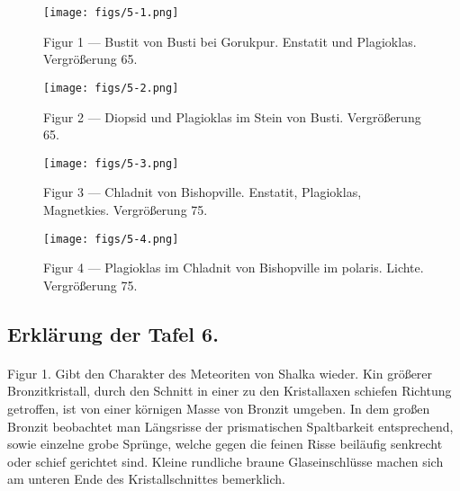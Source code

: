 \documentclass[a4paper, 11pt, oneside, polutonikogreek, german]{article}
\begin{document}
\vspace*{\fill}
\begin{figure}[H]
\centering
\texttt{[image: figs/5-1.png]}
\caption{\small Figur 1 --- Bustit von Busti bei Gorukpur. Enstatit und Plagioklas. Vergrößerung 65.}
\end{figure}
\vspace*{\fill}
\clearpage

\vspace*{\fill}
\begin{figure}[H]
\centering
\texttt{[image: figs/5-2.png]}
\caption{\small Figur 2 --- Diopsid und Plagioklas im Stein von Busti. Vergrößerung 65.}
\end{figure}
\vspace*{\fill}
\clearpage

\vspace*{\fill}
\begin{figure}[H]
\centering
\texttt{[image: figs/5-3.png]}
\caption{\small Figur 3 --- Chladnit von Bishopville. Enstatit, Plagioklas, Magnetkies. Vergrößerung 75.}
\end{figure}
\vspace*{\fill}
\clearpage

\vspace*{\fill}
\begin{figure}[H]
\centering
\texttt{[image: figs/5-4.png]}
\caption{\small Figur 4 --- Plagioklas im Chladnit von Bishopville im polaris. Lichte. Vergrößerung 75.}
\end{figure}
\vspace*{\fill}
\clearpage

\subsection{Erklärung der Tafel 6.}
\paragraph{}
Figur 1. Gibt den Charakter des Meteoriten von Shalka wieder. Kin größerer Bronzitkristall, durch den Schnitt in einer zu den Kristallaxen schiefen Richtung getroffen, ist von einer körnigen Masse von Bronzit umgeben. In dem großen Bronzit beobachtet man Längsrisse der prismatischen Spaltbarkeit entsprechend, sowie einzelne grobe Sprünge, welche gegen die feinen Risse beiläufig senkrecht oder schief gerichtet sind. Kleine rundliche braune Glaseinschlüsse machen sich am unteren Ende des Kristallschnittes bemerklich.
\end{document}
